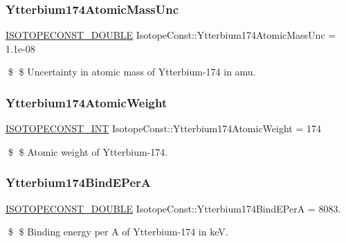 \subsubsection{\texorpdfstring{Ytterbium174\+Atomic\+Mass\+Unc}{Ytterbium174AtomicMassUnc}}
{\footnotesize\ttfamily \mbox{\hyperlink{group___isotope_const-_macros_ga8f45a7272ce02c0b4c65c44636ed719a}{I\+S\+O\+T\+O\+P\+E\+C\+O\+N\+S\+T\+\_\+\+D\+O\+U\+B\+LE}} Isotope\+Const\+::\+Ytterbium174\+Atomic\+Mass\+Unc = 1.\+1e-\/08}

\$ \$ Uncertainty in atomic mass of Ytterbium-\/174 in amu. \mbox{\label{group___isotope_const-_ytterbium-_yb174_gaa81543e6513517a95e35df951f6e9ee7}} 
\subsubsection{\texorpdfstring{Ytterbium174\+Atomic\+Weight}{Ytterbium174AtomicWeight}}
{\footnotesize\ttfamily \mbox{\hyperlink{group___isotope_const-_macros_ga5f18360b3e99483a35c32d789e62621c}{I\+S\+O\+T\+O\+P\+E\+C\+O\+N\+S\+T\+\_\+\+I\+NT}} Isotope\+Const\+::\+Ytterbium174\+Atomic\+Weight = 174}

\$ \$ Atomic weight of Ytterbium-\/174. \mbox{\label{group___isotope_const-_ytterbium-_yb174_gaeb1603ea8760e2cd9e1afb6a33d3861e}} 
\subsubsection{\texorpdfstring{Ytterbium174\+Bind\+E\+PerA}{Ytterbium174BindEPerA}}
{\footnotesize\ttfamily \mbox{\hyperlink{group___isotope_const-_macros_ga8f45a7272ce02c0b4c65c44636ed719a}{I\+S\+O\+T\+O\+P\+E\+C\+O\+N\+S\+T\+\_\+\+D\+O\+U\+B\+LE}} Isotope\+Const\+::\+Ytterbium174\+Bind\+E\+PerA = 8083.}

\$ \$ Binding energy per A of Ytterbium-\/174 in keV. \mbox{\label{group___isotope_const-_ytterbium-_yb174_ga72f68bde3928910c0ac615bafb83730f}} 
